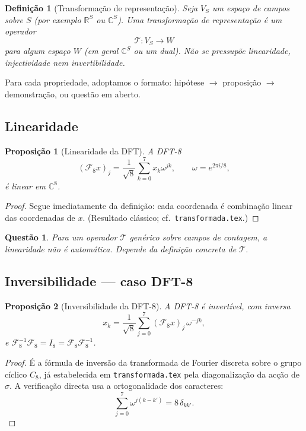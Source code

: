 \documentclass[11pt,a4paper]{article}
\newtheorem{definicao}{Definição}
\newtheorem{proposicao}{Proposição}
\newtheorem{questao}{Questão}
\begin{document}
\begin{definicao}[Transformação de representação]
\label{def:T}
Seja \(V_S\) um espaço de campos sobre \(S\) (por exemplo \(\mathbb R^S\) ou \(\mathbb C^S\)). Uma transformação de representação é um operador
\[
\mathcal T\colon V_S\to W
\]
para algum espaço \(W\) (em geral \(\mathbb C^S\) ou um dual). Não se pressupõe linearidade, injectividade nem invertibilidade.
\end{definicao}

Para cada propriedade, adoptamos o formato: hipótese \(\to\) proposição \(\to\) demonstração, ou questão em aberto.

\subsection{Linearidade}

\begin{proposicao}[Linearidade da DFT]
A DFT-8
\[
(\mathcal F_8 x)_j=\frac1{\sqrt8}\sum_{k=0}^{7}x_k\omega^{jk},\qquad
\omega=e^{2\pi i/8},
\]
é linear em \(\mathbb C^8\).
\end{proposicao}

\begin{proof}
Segue imediatamente da definição: cada coordenada é combinação linear das coordenadas de \(x\). (Resultado clássico; cf.\ \texttt{transformada.tex}.)
\end{proof}

\begin{questao}
Para um operador \(\mathcal T\) genérico sobre campos de contagem, a linearidade não é automática. Depende da definição concreta de \(\mathcal T\).
\end{questao}

\subsection{Inversibilidade --- caso DFT-8}

\begin{proposicao}[Inversibilidade da DFT-8]
\label{prop:dft8-inv}
A DFT-8 é invertível, com inversa
\[
x_k=\frac1{\sqrt8}\sum_{j=0}^{7}(\mathcal F_8 x)_j\,\omega^{-jk},
\]
e \(\mathcal F_8^{-1}\mathcal F_8=I_8=\mathcal F_8\mathcal F_8^{-1}\).
\end{proposicao}

\begin{proof}
É a fórmula de inversão da transformada de Fourier discreta sobre o grupo cíclico \(C_8\), já estabelecida em \texttt{transformada.tex} pela diagonalização da acção de \(\sigma\). A verificação directa usa a ortogonalidade dos caracteres:
\[
\sum_{j=0}^{7}\omega^{j(k-k')}=8\,\delta_{kk'}.
\]
\end{proof}
\end{document}
